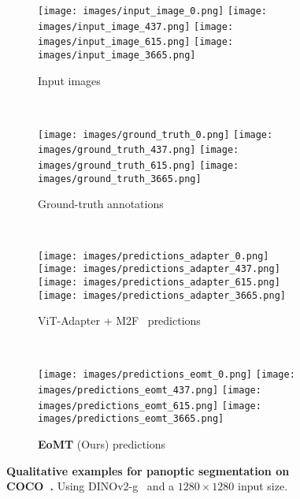 \documentclass[10pt,twocolumn,letterpaper]{article}
\begin{document}
\begin{figure*}[p]
    \centering

    \begin{subfigure}[b]{\linewidth}
        \centering
        \texttt{[image: images/input\_image\_0.png]}
        \texttt{[image: images/input\_image\_437.png]}
        \texttt{[image: images/input\_image\_615.png]}
        \texttt{[image: images/input\_image\_3665.png]}
        \caption{Input images}
    \end{subfigure}\\

    \begin{subfigure}[b]{\linewidth}
        \centering
        \texttt{[image: images/ground\_truth\_0.png]}
        \texttt{[image: images/ground\_truth\_437.png]}
        \texttt{[image: images/ground\_truth\_615.png]}
        \texttt{[image: images/ground\_truth\_3665.png]}
        \caption{Ground-truth annotations}
    \end{subfigure}\\

    \begin{subfigure}[b]{\linewidth}
        \centering
        \texttt{[image: images/predictions\_adapter\_0.png]}
        \texttt{[image: images/predictions\_adapter\_437.png]}
        \texttt{[image: images/predictions\_adapter\_615.png]}
        \texttt{[image: images/predictions\_adapter\_3665.png]}
        \caption{ViT-Adapter + M2F~\cite{chen2023vitadapter,cheng2022mask2former} predictions}
    \end{subfigure}\\

    \begin{subfigure}[b]{\linewidth}
        \centering
        \texttt{[image: images/predictions\_eomt\_0.png]}
        \texttt{[image: images/predictions\_eomt\_437.png]}
        \texttt{[image: images/predictions\_eomt\_615.png]}
        \texttt{[image: images/predictions\_eomt\_3665.png]}
        \caption{\textbf{EoMT} (Ours) predictions}
    \end{subfigure}

    \caption{\textbf{Qualitative examples for panoptic segmentation on COCO~\cite{lin2014coco}.} Using DINOv2-g~\cite{oquab2023dinov2} and a $1280\times1280$ input size.}
    \label{fig:supp:qualitative}
\end{figure*}
\end{document}
